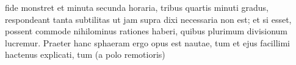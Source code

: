 fide monstret et minuta secunda horaria, tribus quartis minuti gradus, respondeant tanta subtilitas ut jam supra dixi necessaria non est; et si esset, possent commode nihilominus rationes haberi, quibus plurimum divisionum lucremur. Praeter hanc sphaeram ergo opus est nautae, tum et  ejus facillimi hactenus explicati, tum  (a polo remotioris) 